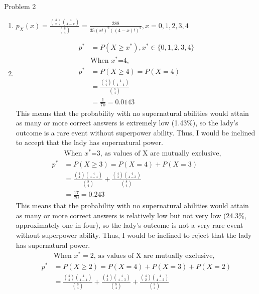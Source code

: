 \documentclass[12pt,letterpaper, onecolumn]{exam}
\begin{document}
\begin{questions}
    \question Problem 2
    \begin{solution}
        \begin{enumerate}
            \item $p_X(x) = \frac{\binom{4}{x} \binom{4}{4-x}}{\binom{8}{4}} = \frac{288}{35(x!)^2((4-x)!)^2}, x=0,1,2,3,4$
            \item \begin{align*}
                p^* & = P(X \geq x^*), x^* \in \{0,1,2,3,4\} \\
                &\text{When $x^*$=4,} \\
                p^* & = P(X \geq 4) = P(X = 4) \\
                & = \frac{\binom{4}{4} \binom{4}{4-4}}{\binom{8}{4}} \\
                & = \frac{1}{70} = 0.0143
            \end{align*}
            This means that the probability with no supernatural abilities would attain as many or more correct answers is extremely low (1.43\%), so the lady's outcome is a rare event without superpower ability. Thus, I would be inclined to accept that the lady has supernatural power. \\
            \begin{align*}
              & \text{When $x^*$=3, as values of X are mutually exclusive,} \\
              p^* & = P(X \geq 3) = P(X = 4)+P(X = 3) \\
                & = \frac{\binom{4}{4} \binom{4}{4-4}}{\binom{8}{4}} + \frac{\binom{4}{3} \binom{4}{4-3}}{\binom{8}{4}} \\
                & = \frac{17}{70} = 0.243
            \end{align*}
            This means that the probability with no supernatural abilities would attain as many or more correct answers is relatively low but not very low (24.3\%, approximately one in four), so the lady's outcome is not a very rare event without superpower ability. Thus, I would be inclined to reject that the lady has supernatural power. \\
            \begin{align*}
              & \text{When $x^*=2$, as values of X are mutually exclusive,} \\
              p^* & = P(X \geq 2) = P(X = 4)+P(X = 3)+P(X = 2) \\
                & = \frac{\binom{4}{4} \binom{4}{4-4}}{\binom{8}{4}} + \frac{\binom{4}{3} \binom{4}{4-3}}{\binom{8}{4}} + \frac{\binom{4}{2} \binom{4}{4-2}}{\binom{8}{4}} \\

\end{align*}
\end{enumerate}
\end{solution}
\end{questions}
\end{document}
